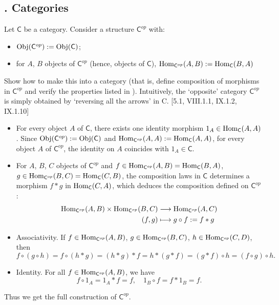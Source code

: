\subsection{. Categories}
\hypertarget{Exercise I.3.1}{}
\begin{problem}[3.1]
	Let $\mathsf{C}$ be a category. Consider a structure $\mathsf{C}^{op}$ with:
	\begin{itemize}
	\item $\mathrm{Obj}(\mathsf{C}^{op}) := \mathrm{Obj}(\mathsf{C})$;
	\item for $A$, $B$ objects of $\mathsf{C}^{op}$ (hence, objects of $\mathsf{C}$), $\mathrm{Hom}_{\mathsf{C}^{op}} (A,B) := \mathrm{Hom}_\mathsf{C}(B,A)$
	\end{itemize}
	Show how to make this into a category (that is, define composition of morphisms
	in $\mathsf{C}^{op}$ and verify the properties listed in ).
	Intuitively, the `opposite' category $\mathsf{C}^{op}$ is simply obtained by `reversing all the
	arrows' in C. [5.1, \textsection VIII.1.1, \textsection IX.1.2, IX.1.10]
\end{problem}
\begin{solution}
	\begin{itemize}
		\item For every object $A$ of $\mathsf{C}$, there exists one identity morphism $1_A\in\mathrm{Hom}_\mathsf{C}(A,A)$. Since $\mathrm{Obj}(\mathsf{C}^{op}) := \mathrm{Obj}(\mathsf{C})$ and $\mathrm{Hom}_{\mathsf{C}^{op}} (A,A) := \mathrm{Hom}_\mathsf{C}(A,A)$, for every object $A$ of $\mathsf{C}^{op}$, the identity on $A$ coincides with $1_A\in\mathsf{C}$. 
		\item For $A$, $B$, $C$ objects of $\mathsf{C}^{op}$ and $f\in\mathrm{Hom}_{\mathsf{C}^{op}} (A,B)=\mathrm{Hom}_\mathsf{C}(B,A)$, $g\in\mathrm{Hom}_{\mathsf{C}^{op}} (B,C)=\mathrm{Hom}_\mathsf{C}(C,B)$, the composition laws in $\mathsf{C}$ determines a morphism $f*g$ in $\mathrm{Hom}_{\mathsf{C}} (C,A)$, which deduces the composition defined on $\mathsf{C}^{op}$:
		\[
		\begin{aligned}
		\mathrm{Hom}_{\mathsf{C}^{op}} (A,B)\times\mathrm{Hom}_{\mathsf{C}^{op}} (B,C)&\longrightarrow \mathrm{Hom}_{\mathsf{C}^{op}} (A,C)\\
		(f,g)&\longmapsto g\circ f:=f*g
		\end{aligned}
		\]
		\item Associativity. If $f\in\mathrm{Hom}_{\mathsf{C}^{op}} (A,B)$, $g\in\mathrm{Hom}_{\mathsf{C}^{op}} (B,C)$, $h\in\mathrm{Hom}_{\mathsf{C}^{op}} (C,D)$, then
		\[
		f\circ(g\circ h)=f\circ(h*g)=(h*g)*f=h*(g*f)=(g*f)\circ h=(f\circ g)\circ h.
		\]
		\item Identity. For all $f\in\mathrm{Hom}_{\mathsf{C}^{op}} (A,B)$, we have
		\[
		f\circ 1_A=1_A*f=f,\quad 1_B\circ f=f*1_B=f.
		\]
	\end{itemize}
	Thus we get the full construction of $\mathsf{C}^{op}$.
\end{solution}

